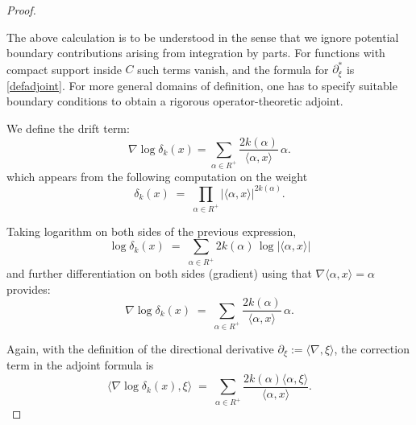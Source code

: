 \documentclass[10pt,a4paper]{amsart}
\begin{document}
\begin{proof}
\begin{remark}
The above calculation is to be understood in the sense that we ignore potential boundary contributions arising from
integration by parts.  For functions with compact support inside $C$
such terms vanish, and the formula for $\partial_\xi^{*}$ is \eqref{defadjoint}.
For more general domains of definition, one has to specify suitable
boundary conditions to obtain a rigorous operator-theoretic adjoint.
\end{remark}

We define the drift term:
\begin{equation}\label{driftdef}
  \nabla \log \delta_{k}(x)
  = \sum_{\alpha \in R^{+}} \frac{2k(\alpha)}{\langle \alpha,x\rangle}\, \alpha .
\end{equation}
\noindent
which appears from the following computation on the weight
\[
  \delta_k(x) \;=\; \prod_{\alpha \in R^+} |\langle \alpha , x \rangle|^{2k(\alpha)} .
\]

Taking logarithm on both sides of the previous expression, 
\[
  \log \delta_k(x)
  \;=\; \sum_{\alpha \in R^+} 2k(\alpha)\, \log |\langle \alpha , x \rangle| 
\]
\noindent
and further differentiation on both sides (gradient) using that \(\nabla \langle \alpha , x \rangle = \alpha\) provides:
\[
  \nabla \log \delta_k(x)
  \;=\; \sum_{\alpha \in R^+} \frac{2k(\alpha)}{\langle \alpha , x \rangle}\, \alpha .
\]


Again, with the definition of  the directional derivative
\(\partial_\xi := \langle \nabla , \xi \rangle\),  the correction term in the adjoint formula is
\[
  \langle \nabla \log \delta_k(x), \xi \rangle
  \;=\; \sum_{\alpha \in R^+} 
         \frac{2k(\alpha)\langle \alpha , \xi \rangle}{\langle \alpha , x \rangle}.
\]


\end{proof}
\end{document}
